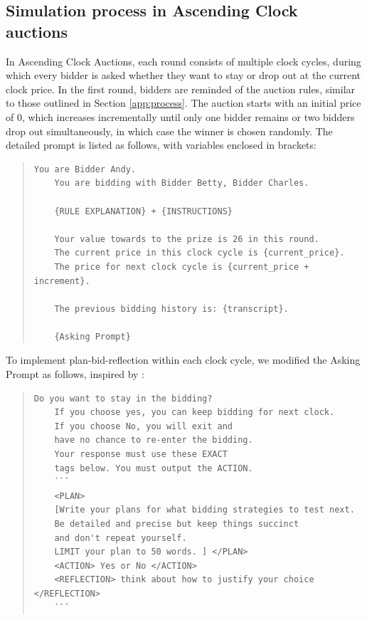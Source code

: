 \documentclass{article} %
\begin{document}
\subsection{Simulation process in   Ascending Clock auctions}\label{app:dynamic}

In Ascending Clock Auctions, each round consists of multiple clock cycles, during which every bidder is asked whether they want to stay or drop out at the current clock price.
In the first round, bidders are reminded of the auction rules, similar to those outlined in Section \ref{app:process}. 
The auction starts with an initial price of 0, which increases incrementally until only one bidder remains or two bidders drop out simultaneously, in which case the winner is chosen randomly. 
The detailed prompt is listed as follows, with variables enclosed in brackets:

\begin{quote}
\begin{lstlisting}[basicstyle=\ttfamily]
    You are Bidder Andy.            
    You are bidding with Bidder Betty, Bidder Charles.     
    
    {RULE EXPLANATION} + {INSTRUCTIONS} 

    Your value towards to the prize is 26 in this round.
    The current price in this clock cycle is {current_price}. 
    The price for next clock cycle is {current_price + increment}.

    The previous bidding history is: {transcript}.
    
    {Asking Prompt}
\end{lstlisting}
\end{quote}

To implement plan-bid-reflection within each clock cycle, we modified the Asking Prompt as follows, inspired by \citet{fish2024algorithmic}:

\begin{quote}
\begin{lstlisting}[basicstyle=\ttfamily]
    Do you want to stay in the bidding? 
    If you choose yes, you can keep bidding for next clock. 
    If you choose No, you will exit and
    have no chance to re-enter the bidding.
    Your response must use these EXACT 
    tags below. You must output the ACTION.
    ```
    <PLAN>
    [Write your plans for what bidding strategies to test next.
    Be detailed and precise but keep things succinct 
    and don't repeat yourself. 
    LIMIT your plan to 50 words. ] </PLAN>
    <ACTION> Yes or No </ACTION>
    <REFLECTION> think about how to justify your choice </REFLECTION>
    ```
\end{lstlisting}
\end{quote}
\end{document}
